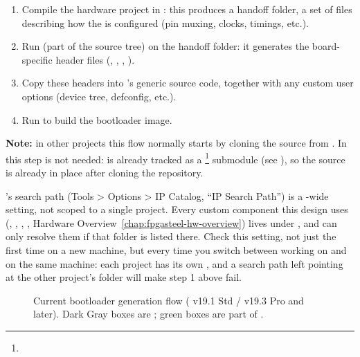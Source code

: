\begin{enumerate}
    \item Compile the hardware project in : this produces a handoff folder, a set of  files describing how the  is configured (pin muxing, clocks,  timings, etc.).
    \item Run  \cite{MACNICA-BOOT} (part of the  source tree) on the handoff folder: it generates the board-specific header files (, , , ).
    \item Copy these headers into 's generic source code, together with any custom user options (device tree, defconfig, etc.).
    \item Run  to build the bootloader image.
\end{enumerate}

\textbf{Note:} in other projects this flow normally starts by cloning the  source from . In  this step is not needed:  \cite{SUB-UBOOT} is already tracked as a \footnote{} submodule (see ), so the source is already in place after cloning the repository.

\begin{warningbox}
    's  search path (Tools > Options > IP Catalog, ``IP Search Path'') is a -wide setting, not scoped to a single project. Every custom component this design uses (, , , , Hardware Overview~\ref{chap:fpgasteel-hw-overview}) lives under , and  can only resolve them if that folder is listed there. Check this setting, not just the first time on a new machine, but every time you switch between working on  and  on the same machine: each project has its own , and a search path left pointing at the other project's folder will make step 1 above fail.
\end{warningbox}

\begin{figure}[htbp]
    \centering
    
    \caption{Current bootloader generation flow ( v19.1 Std / v19.3 Pro and later). Dark Gray boxes are ; green boxes are part of .}
    \label{fig:fpgasteel-bootloader-generation}
\end{figure}

